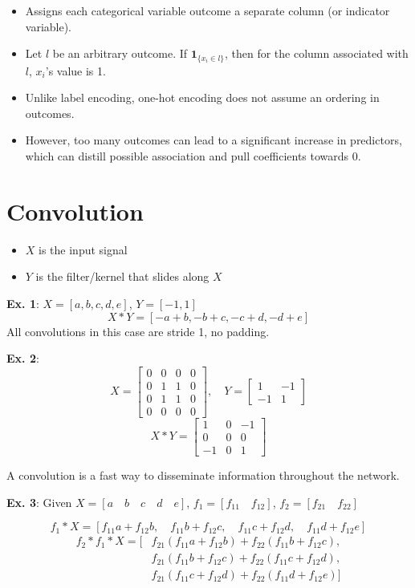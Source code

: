 \documentclass{article}
\begin{document}
\begin{itemize}
    \item Assigns each categorical variable outcome a separate column (or indicator variable).
    \item Let $l$ be an arbitrary outcome. If $\mathbf {1}_{\{x_i \in l\}}$, then for the column
    associated with $l$, $x_i$'s value is 1.
    \item Unlike label encoding, one-hot encoding does not assume an ordering in outcomes.
    \item However, too many outcomes can lead to a significant increase in predictors, which can distill possible
    association and pull coefficients towards 0.
\end{itemize}

\section{Convolution}
\begin{itemize}
    \item $X$ is the input signal
    \item $Y$ is the filter/kernel that slides along $X$
\end{itemize}

\textbf{Ex. 1}: $X = [a, b, c, d, e]$, $Y = [-1, 1]$
\[
    X * Y = [-a + b, -b + c, -c + d, -d + e]
\]
All convolutions in this case are stride 1, no padding.

\textbf{Ex. 2}:
\[
    X = \begin{bmatrix} 0 & 0 & 0 & 0 \\ 0 & 1 & 1 & 0 \\ 0 & 1 & 1 & 0 \\ 0 & 0 & 0 & 0 \end{bmatrix}, \quad
    Y = \begin{bmatrix} 1 & -1 \\ -1 & 1 \end{bmatrix}
\]
\[
    X * Y = \begin{bmatrix} 1 & 0 & -1 \\ 0 & 0 & 0 \\ -1 & 0 & 1 \end{bmatrix}
\]

A convolution is a fast way to disseminate information throughout the network.

\textbf{Ex. 3}: Given $X = [a \quad b \quad c \quad d \quad e]$, $f_1 = [f_{11} \quad f_{12}]$, $f_2 = [f_{21} \quad f_{22}]$

\[
    f_1 * X = [f_{11}a + f_{12}b, \quad f_{11}b + f_{12}c, \quad f_{11}c + f_{12}d, \quad f_{11}d + f_{12}e]
\]
\begin{align*}
    f_2 * f_1 * X = [&f_{21}(f_{11}a + f_{12}b) + f_{22}(f_{11}b + f_{12}c), \\
    &f_{21}(f_{11}b + f_{12}c) + f_{22}(f_{11}c + f_{12}d), \\
    &f_{21}(f_{11}c + f_{12}d) + f_{22}(f_{11}d + f_{12}e)]
\end{align*}
\end{document}
